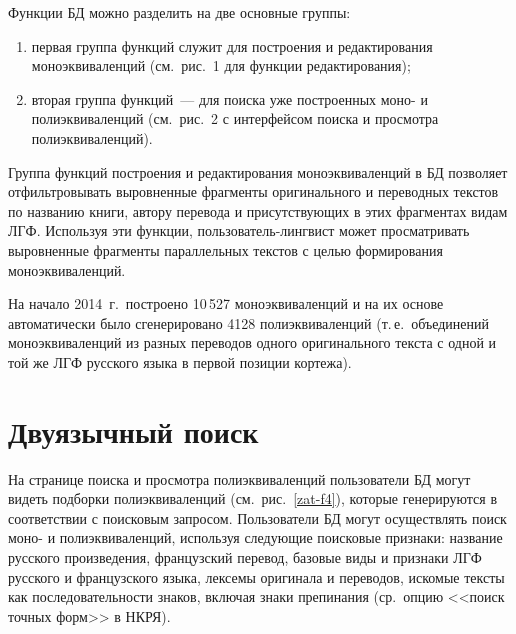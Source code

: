 \begin{multicols}{2}
  Функции БД можно разделить на две основные группы:
\begin{enumerate}[(1)]
\item первая группа
функций служит для по\-стро\-ения и редактирования моноэквиваленций (см.\
рис.~1 для функции редактирования);
\item вторая группа функций~---
для поиска уже по\-стро\-ен\-ных моно- и полиэквиваленций (см.\ рис.~2 с
интерфейсом поиска и просмотра полиэквиваленций).
\end{enumerate}
 Группа функций
построения и редактирования моноэквиваленций в БД позволяет
отфильтровывать выровненные фрагменты оригинального и переводных
текстов по названию книги, автору перевода и присутствующих в этих
фрагментах видам ЛГФ. Используя эти функции, поль\-зо\-ва\-тель-лин\-г\-вист может
просматривать выровненные фрагменты параллельных текстов с целью
формирования моноэквиваленций.

  На начало 2014~г.\ построено 10\,527 моноэквиваленций и на их основе
автоматически было сгенерировано 4128 полиэквиваленций (т.\,е.\ объединений
моноэквиваленций из разных переводов \mbox{одного} оригинального текста с одной и
той же ЛГФ русского языка в первой позиции кортежа).

\vspace*{-6pt}

\section{Двуязычный поиск} %

  На странице поиска и просмотра полиэквиваленций пользователи БД могут
видеть подборки полиэквиваленций (см.\ рис.~\ref{zat-f4}), которые генерируются в
соответствии с поисковым запросом. Пользователи БД могут осуществлять
поиск моно- и полиэквиваленций, используя следующие поисковые признаки:
название русского произведения, французский перевод, базовые виды и
признаки ЛГФ русского и французского языка, лексемы оригинала и переводов,
искомые тексты как последовательности знаков, включая знаки препинания
(ср.\ опцию <<поиск точных форм>> в НКРЯ).

\begin{figure*} %
\vspace*{1pt}
\begin{center}
\mbox{%
\epsfxsize=140mm
}
\end{center}
\vspace*{-9pt}
\end{figure*}


\end{multicols}
